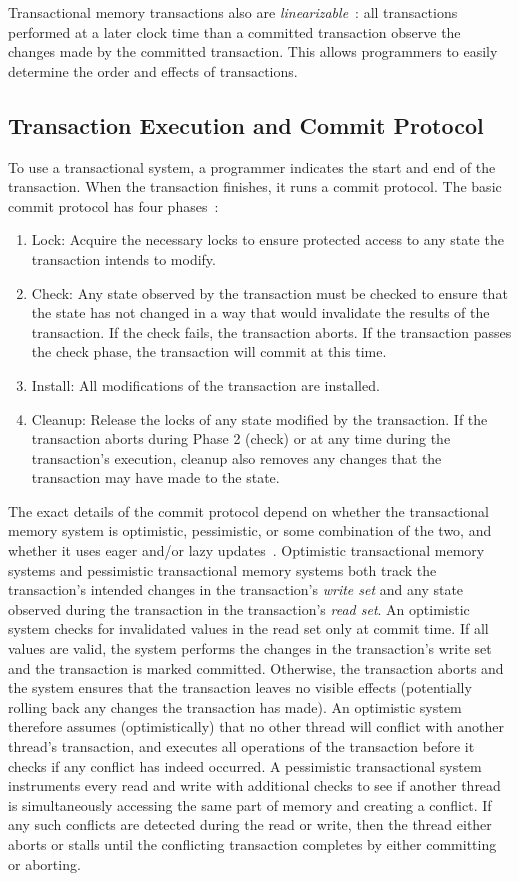 Transactional memory transactions also are \emph{linearizable}~\cite{linearizability}: all transactions performed at a later clock time than a committed transaction observe the changes made by the committed transaction. This allows programmers to easily determine the order and effects of transactions.

\subsection{Transaction Execution and Commit Protocol}
To use a transactional system, a programmer indicates the start and end of the transaction. When the transaction finishes, it runs a commit protocol. The basic commit protocol has four phases~\cite{harristm}:
\begin{enumerate}
    \item Lock: Acquire the necessary locks to ensure protected access to any state the transaction intends to modify.
    \item Check: Any state observed by the transaction must be checked to ensure that the state has not changed in a way that would invalidate the results of the transaction. If the check fails, the transaction aborts. If the transaction passes the check phase, the transaction will commit at this time.
    \item Install: All modifications of the transaction are installed.
    \item Cleanup: Release the locks of any state modified by the transaction. If the transaction aborts during Phase 2 (check) or at any time during the transaction's execution, cleanup also removes any changes that the transaction may have made to the state.
\end{enumerate}

The exact details of the commit protocol depend on whether the transactional memory system is optimistic, pessimistic, or some combination of the two, and whether it uses eager and/or lazy updates~\cite{harristm}. 
Optimistic transactional memory systems and pessimistic transactional memory systems both track the transaction's intended changes in the transaction's \emph{write set} and any state observed during the transaction in the transaction's \emph{read set}. 
An optimistic system checks for invalidated values in the read set only at commit time. If all values are valid, the system performs the changes in the transaction's write set and the transaction is marked committed. Otherwise, the transaction aborts and the system ensures that the transaction leaves no visible effects (potentially rolling back any changes the transaction has made). An optimistic system therefore assumes (optimistically) that no other thread will conflict with another thread's transaction, and executes all operations of the transaction before it checks if any conflict has indeed occurred.
A pessimistic transactional system instruments every read and write with additional checks to see if another thread is simultaneously accessing the same part of memory and creating a conflict. If any such conflicts are detected during the read or write, then the thread either aborts or stalls until the conflicting transaction completes by either committing or aborting.

